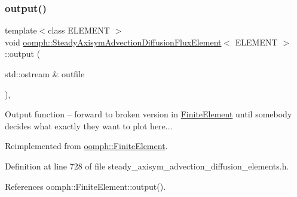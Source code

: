 \mbox{\label{classoomph_1_1SteadyAxisymAdvectionDiffusionFluxElement_a4cdff939f33cc6d4c8d5eb7d0728aa73}} 
\subsubsection{\texorpdfstring{output()}{output()}\hspace{0.1cm}{\footnotesize\ttfamily [1/2]}}
{\footnotesize\ttfamily template$<$class E\+L\+E\+M\+E\+NT $>$ \\
void \hyperlink{classoomph_1_1SteadyAxisymAdvectionDiffusionFluxElement}{oomph\+::\+Steady\+Axisym\+Advection\+Diffusion\+Flux\+Element}$<$ E\+L\+E\+M\+E\+NT $>$\+::output (\begin{DoxyParamCaption}\item[{std\+::ostream \&}]{outfile }\end{DoxyParamCaption})\hspace{0.3cm}{\ttfamily [inline]}, {\ttfamily [virtual]}}



Output function -- forward to broken version in \hyperlink{classoomph_1_1FiniteElement}{Finite\+Element} until somebody decides what exactly they want to plot here... 



Reimplemented from \hyperlink{classoomph_1_1FiniteElement_a2ad98a3d2ef4999f1bef62c0ff13f2a7}{oomph\+::\+Finite\+Element}.



Definition at line 728 of file steady\+\_\+axisym\+\_\+advection\+\_\+diffusion\+\_\+elements.\+h.



References oomph\+::\+Finite\+Element\+::output().

\mbox{\label{classoomph_1_1SteadyAxisymAdvectionDiffusionFluxElement_ab3d29e1b0f31936338b1b3a828ea8d9b}} 
